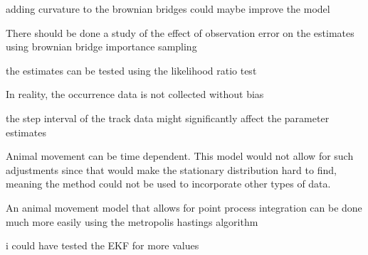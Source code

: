 adding curvature to the brownian bridges could maybe improve the model


There should be done a study of the effect of observation error on the estimates using brownian bridge importance sampling

the estimates can be tested using the likelihood ratio test


In reality, the occurrence data is not collected without bias

the step interval of the track data might significantly affect the parameter estimates

Animal movement can be time dependent. This model would not allow for such adjustments since that would make the stationary distribution hard to find, meaning the method could not be used to incorporate other types of data.

An animal movement model that allows for point process integration can be done much more easily using the metropolis hastings algorithm

i could have tested the EKF for more values